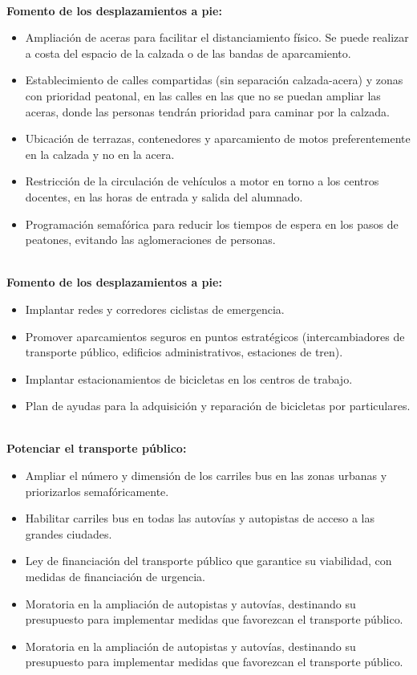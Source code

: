 \documentclass[a4paper,11pt]{article}
\begin{document}
\textbf{\\ Fomento de los desplazamientos a pie:}
\begin{itemize}
\item Ampliación de aceras para facilitar el distanciamiento físico. Se puede realizar a costa del
espacio de la calzada o de las bandas de aparcamiento.
\item Establecimiento de calles compartidas (sin separación calzada-acera) y zonas con prioridad
peatonal, en las calles en las que no se puedan ampliar las aceras, donde las personas
tendrán prioridad para caminar por la calzada.
\item Ubicación de terrazas, contenedores y aparcamiento de motos preferentemente en la
calzada y no en la acera.
\item Restricción de la circulación de vehículos a motor en torno a los centros docentes, en las
horas de entrada y salida del alumnado.
\item Programación semafórica para reducir los tiempos de espera en los pasos de peatones,
evitando las aglomeraciones de personas.
\end{itemize}
\textbf{\\ Fomento de los desplazamientos a pie:}
\begin{itemize}
\item Implantar redes y corredores ciclistas de emergencia.
\item Promover aparcamientos seguros en puntos estratégicos (intercambiadores de transporte
público, edificios administrativos, estaciones de tren).
\item Implantar estacionamientos de bicicletas en los centros de trabajo.
\item Plan de ayudas para la adquisición y reparación de bicicletas por particulares.
\end{itemize}
\textbf{\\ Potenciar el transporte público:}
\begin{itemize}
\item Ampliar el número y dimensión de los carriles bus en las zonas urbanas y priorizarlos
semafóricamente.
\item Habilitar carriles bus en todas las autovías y autopistas de acceso a las grandes ciudades.
\item Ley de financiación del transporte público que garantice su viabilidad, con medidas de
financiación de urgencia.
\item Moratoria en la ampliación de autopistas y autovías, destinando su presupuesto para
implementar medidas que favorezcan el transporte público.
\item Moratoria en la ampliación de autopistas y autovías, destinando su presupuesto para
implementar medidas que favorezcan el transporte público.
\end{itemize}
\end{document}
